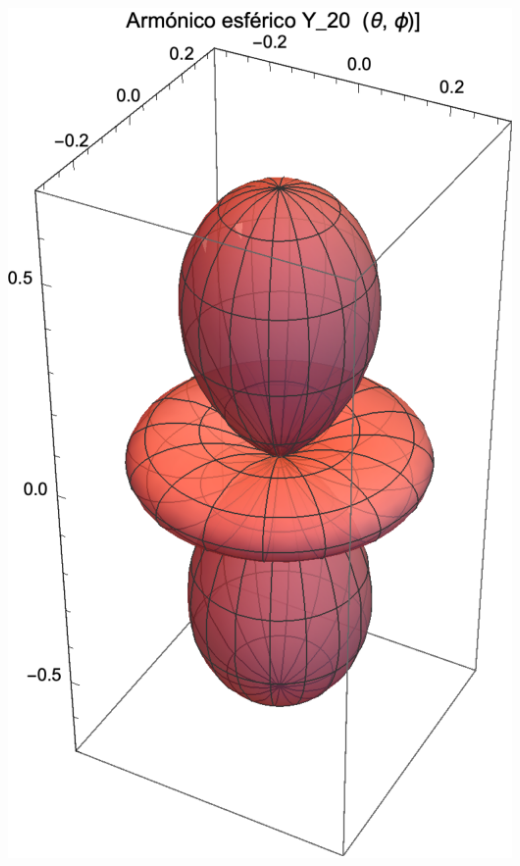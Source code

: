 \begin{minipage}{0.4\textwidth}
    \centering
    \includegraphics[scale=0.7]{Imagenes/Armonicos_Esfericos_20.eps}
\end{minipage}
\hspace{0.6cm}
